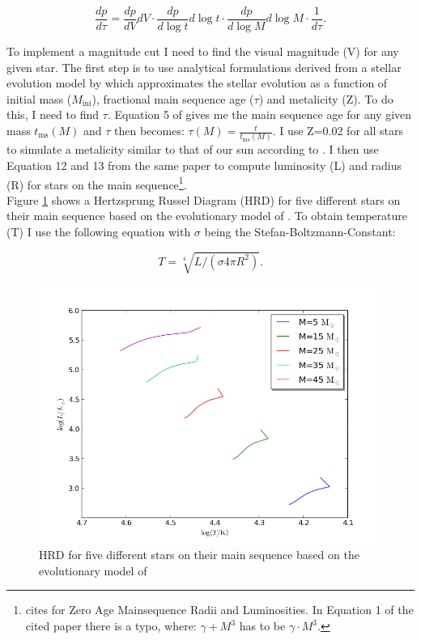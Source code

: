 \documentclass[a4paper,10pt]{article}
\begin{document}
 \begin{equation}
  \frac{dp}{d\tau}=\frac{dp}{dV}dV \cdot \frac{dp}{d\log t}d\log t \cdot \frac{dp}{d\log M}d\log M\cdot \frac{1}{d\tau}.
 \end{equation}
  
 
 To implement a magnitude cut I need to find the visual magnitude (V) for any given star. 
 The first step is to use analytical formulations derived from a stellar evolution model by \citet{2000MNRAS.315..543H} which approximates the
 stellar evolution as a function of initial mass ($M_{\mathrm{ini}}$), fractional main sequence age ($\tau$) and metalicity (Z).
 To do this, I need to find $\tau$. Equation 5 of \citep{2000MNRAS.315..543H} gives me the main sequence age for any given mass
 $t_{\mathrm{ms}}(M)$ and $\tau$ then becomes: $\tau(M)=\frac{t}{t_{\mathrm{ms}}(M)}$. I use Z=0.02 for all stars to simulate a metalicity
 similar to that of our sun according to \citet*{1998SSRv...85..161G}.
 I then use Equation 12 and 13 from the same paper to compute luminosity (L) and radius (R) for stars on the main sequence\footnote{
 \citet{2000MNRAS.315..543H} cites \citet*{1996MNRAS.281..257T} for Zero Age Mainsequence Radii and Luminosities. 
 In Equation 1 of the cited paper there is a typo, where: $\gamma + M^3$ has to be $\gamma \cdot M^3$.}. \\
 
 Figure \ref{lumiradius} shows a Hertzsprung Russel Diagram (HRD) for five different stars on their main sequence based on the evolutionary
 model of \citet{2000MNRAS.315..543H}. To obtain temperature (T) I use the following equation with $\sigma$ being the Stefan-Boltzmann-Constant:
 
 \begin{equation}
  T=\sqrt[4]{L/(\sigma 4 \pi R^2)}.
 \end{equation}
 
  \begin{figure}[h!]
  \includegraphics[width=\textwidth]{lumiradius}
  \caption{HRD for five different stars on their main sequence based on the evolutionary model of \citet{2000MNRAS.315..543H} \label{lumiradius}}
 \end{figure}
 
\end{document}
